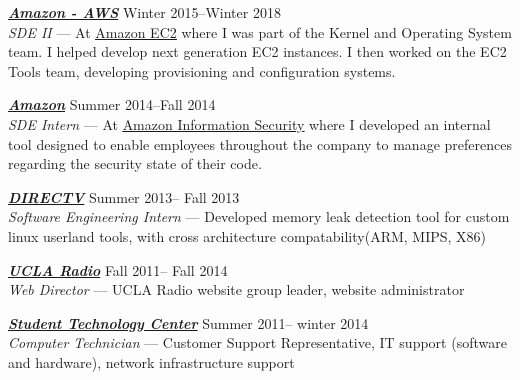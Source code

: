 \documentclass[line,letterpaper]{resume}
\begin{document}
\begin{resume}
	{\sl\textbf{\href{https://aws.amazon.com/}{Amazon - AWS}}} \hfill Winter 2015--Winter 2018\\
    \emph{SDE II } --- At \underline{\href{http://aws.amazon.com/ec2}
	{Amazon EC2}} where I was part of the Kernel and Operating System team. I helped
	develop next generation EC2 instances. I then worked on the EC2 Tools team,
        developing provisioning and configuration systems.

	{\sl\textbf{\href{www.amazon.com}{Amazon}}} \hfill Summer 2014--Fall 2014\\
    \emph{SDE Intern} --- At \underline{\href{https://www.amazon.jobs/en/teams/infosec}
    {Amazon Information Security}} where I developed an internal tool designed to
	enable employees throughout the company to manage preferences regarding the
	security state of their code.

    {\sl\textbf{\href{www.directv.com}{DIRECTV}}} \hfill Summer 2013-- Fall 2013\\
    \emph{Software Engineering Intern}
    ---  Developed memory leak detection tool for custom linux userland tools,
	with cross architecture compatability(ARM, MIPS, X86)

    {\sl\textbf{\href{https://uclaradio.com}{UCLA Radio}}} \hfill Fall 2011-- Fall 2014\\
    \emph{Web Director} --- UCLA Radio website group leader, website administrator

    {\sl\textbf{\href{https://housing.ucla.edu/residence-hall-computing}
	{Student Technology Center}}} \hfill Summer 2011-- winter 2014\\
    \emph{Computer Technician} --- Customer Support Representative,
IT support (software and hardware), network infrastructure support
    \vspace{-6pt}



\end{resume}
\end{document}
